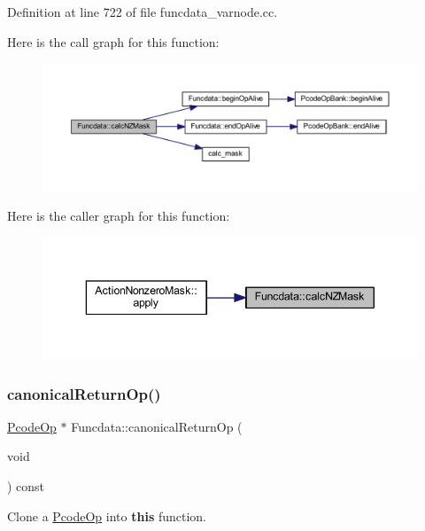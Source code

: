 Definition at line 722 of file funcdata\+\_\+varnode.\+cc.

Here is the call graph for this function\+:
\nopagebreak
\begin{figure}[H]
\begin{center}
\leavevmode
\includegraphics[width=350pt]{class_funcdata_a5b338d2b2d1a72db73369e8631125ffd_cgraph}
\end{center}
\end{figure}
Here is the caller graph for this function\+:
\nopagebreak
\begin{figure}[H]
\begin{center}
\leavevmode
\includegraphics[width=343pt]{class_funcdata_a5b338d2b2d1a72db73369e8631125ffd_icgraph}
\end{center}
\end{figure}
\mbox{\label{class_funcdata_a2e96275c93ab53257f8b56d6ee9737bb}} 
\subsubsection{\texorpdfstring{canonicalReturnOp()}{canonicalReturnOp()}}
{\footnotesize\ttfamily \mbox{\hyperlink{class_pcode_op}{Pcode\+Op}} $\ast$ Funcdata\+::canonical\+Return\+Op (\begin{DoxyParamCaption}\item[{void}]{ }\end{DoxyParamCaption}) const}



Clone a \mbox{\hyperlink{class_pcode_op}{Pcode\+Op}} into {\bfseries{this}} function. 

